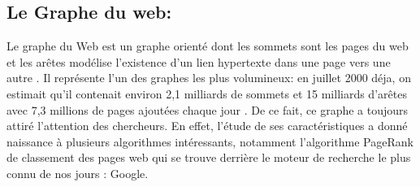 		\subsection{Le Graphe du web:}
		 Le graphe du Web est un graphe orienté dont les sommets sont les pages du web et les arêtes modélise l'existence d'un lien hypertexte dans une page vers une autre \citep{brisaboa2009k}. Il représente l'un des graphes les plus volumineux: en juillet 2000 déja, on estimait qu’il contenait environ 2,1 milliards de sommets et 15 milliards d’arêtes avec 7,3 millions de pages ajoutées chaque jour \citep{guillaume2002web}. De ce fait, ce graphe a toujours attiré l'attention des chercheurs. En effet, l'étude de ses caractéristiques a donné naissance à plusieurs algorithmes intéressants, notamment l'algorithme PageRank de classement des pages web qui se trouve derrière le moteur de recherche le plus connu de nos jours : Google.